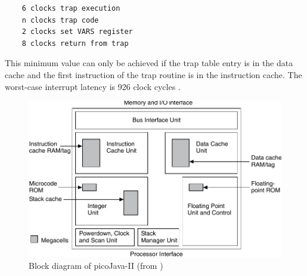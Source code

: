 \begin{verbatim}
    6 clocks trap execution
    n clocks trap code
    2 clocks set VARS register
    8 clocks return from trap
\end{verbatim}


This minimum value can only be achieved if the trap table entry is
in the data cache and the first instruction of the trap routine is
in the instruction cache. The worst-case interrupt latency is 926
clock cycles \cite{pjProgRef}.

\begin{figure}
    \centering
    \includegraphics[scale=0.85]{related/related_picojava}
    \caption[Block diagram of picoJava-II]
    {Block diagram of picoJava-II (from \cite{pjMicroArch})}
    \label{fig_related_picojava}
\end{figure}

